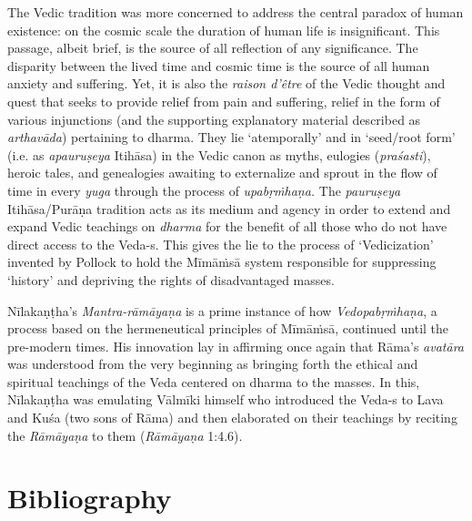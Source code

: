 The Vedic tradition was more concerned to address the central paradox of human existence: on the cosmic scale the duration of human life is insignificant. This passage, albeit brief, is the source of all reflection of any significance. The disparity between the lived time and cosmic time is the source of all human anxiety and suffering. Yet, it is also the \textit{raison d'être} of the Vedic thought and quest that seeks to provide relief from pain and suffering, relief in the form of various injunctions (and the supporting explanatory material described as \textit{arthavāda}) pertaining to dharma. They lie ‘atemporally’ and in ‘seed/root form’ (i.e. as \textit{apauruṣeya }Itihāsa) in the Vedic canon as myths, eulogies (\textit{praśasti}), heroic tales, and genealogies awaiting to externalize and sprout in the flow of time in every \textit{yuga} through the process of \textit{upabṛṁhaṇa.} The \textit{pauruṣeya} Itihāsa/Purāṇa tradition acts as its medium and agency in order to extend and expand Vedic teachings on \textit{dharma} for the benefit of all those who do not have direct access to the Veda-s. This gives the lie to the process of ‘Vedicization’ invented by Pollock to hold the Mīmāṁsā system responsible for suppressing ‘history’ and depriving the rights of disadvantaged masses.

Nīlakaṇṭha's \textit{Mantra-rāmāyaṇa} is a prime instance of how \textit{Vedopabṛṁ\-haṇa}, a process based on the hermeneutical principles of Mīmāṁsā, continued until the pre-modern times. His innovation lay in affirming once again that Rāma's \textit{avatāra} was understood from the very beginning as bringing forth the ethical and spiritual teachings of the Veda centered on dharma to the masses. In this, Nīlakaṇṭha was emulating Vālmīki himself who introduced the Veda-s to Lava and Kuśa (two sons of Rāma) and then elaborated on their teachings by reciting the \textit{Rāmāyaṇa} to them (\textit{Rāmāyaṇa} 1:4.6).


\section*{Bibliography}

